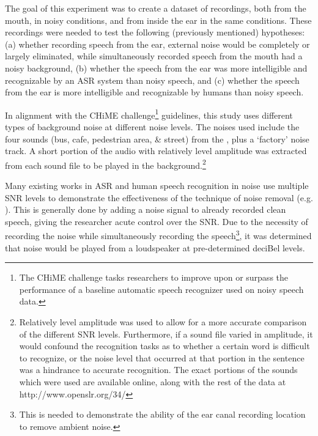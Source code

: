 \documentclass[dissertation,copyright]{uathesis}
\begin{document}
The goal of this experiment was to create a dataset of recordings, both from the mouth, in noisy conditions, and from inside the ear in the same conditions.  These recordings were needed to test the following (previously mentioned) hypotheses: (a) whether recording speech from the ear, external noise would be completely or largely eliminated, while simultaneously recorded speech from the mouth had a noisy background, (b) whether the speech from the ear was more intelligible and recognizable by an ASR system than noisy speech, and (c) whether the speech from the ear is more intelligible and recognizable by humans than noisy speech. 

In alignment with the CHiME challenge\footnote{The CHiME challenge tasks researchers to improve upon or surpass the performance of a baseline automatic speech recognizer used on noisy speech data.} guidelines, this study uses different types of background noise at different noise levels.  The noises used include the four sounds (bus, cafe, pedestrian area, \& street) from the \cite{chime:16}, plus a `factory' noise track.  A short portion of the audio with relatively level amplitude was extracted from each sound file to be played in the background.\footnote{Relatively level amplitude was used to allow for a more accurate comparison of the different SNR levels. Furthermore, if a sound file varied in amplitude, it would confound the recognition tasks as to whether a certain word is difficult to recognize, or the noise level that occurred at that portion in the sentence was a hindrance to accurate recognition. The exact portions of the sounds which were used are available online, along with the rest of the data at http://www.openslr.org/34/}

Many existing works in ASR and human speech recognition in noise use multiple SNR levels to demonstrate the effectiveness of the technique of noise removal (e.g. \cite{braun:16}).  This is generally done by adding a noise signal to already recorded clean speech, giving the researcher acute control over the SNR.  Due to the necessity of recording the noise while simultaneously recording the speech\footnote{This is needed to demonstrate the ability of the ear canal recording location to remove ambient noise.}, it was determined that noise would be played from a loudspeaker at pre-determined deciBel levels.  
\end{document}
